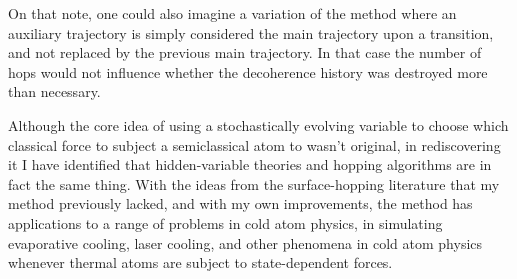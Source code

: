 On that note, one could also imagine a variation of the method where an auxiliary trajectory is simply considered the main trajectory upon a transition, and not replaced by the previous main trajectory. In that case the number of hops would not influence whether the decoherence history was destroyed more than necessary.

Although the core idea of using a stochastically evolving variable to choose which classical force to subject a semiclassical atom to wasn't original, in rediscovering it I have identified that hidden-variable theories and hopping algorithms are in fact the same thing. With the ideas from the surface-hopping literature that my method previously lacked, and with my own improvements, the method has applications to a range of problems in cold atom physics, in simulating evaporative cooling, laser cooling, and other phenomena in cold atom physics whenever thermal atoms are subject to state-dependent forces. 